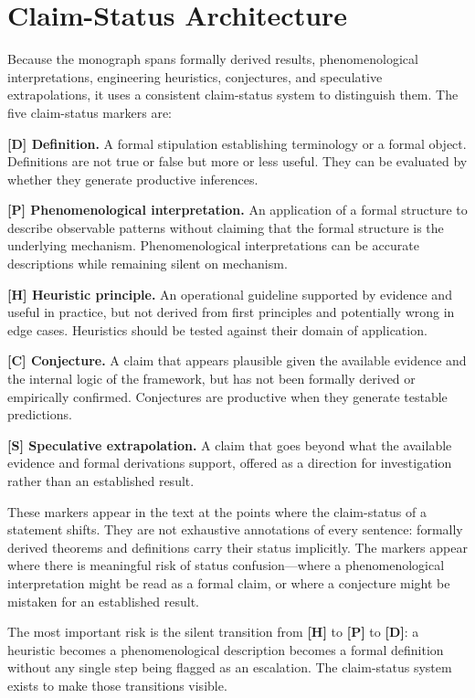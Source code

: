 \section*{Claim-Status Architecture}

Because the monograph spans formally derived results, phenomenological interpretations,
engineering heuristics, conjectures, and speculative extrapolations, it uses a
consistent claim-status system to distinguish them. The five claim-status markers are:

\begin{claimstatus}
\textbf{[D] Definition.} A formal stipulation establishing terminology or a formal
object. Definitions are not true or false but more or less useful. They can be
evaluated by whether they generate productive inferences.

\textbf{[P] Phenomenological interpretation.} An application of a formal structure
to describe observable patterns without claiming that the formal structure is the
underlying mechanism. Phenomenological interpretations can be accurate descriptions
while remaining silent on mechanism.

\textbf{[H] Heuristic principle.} An operational guideline supported by evidence and
useful in practice, but not derived from first principles and potentially wrong in
edge cases. Heuristics should be tested against their domain of application.

\textbf{[C] Conjecture.} A claim that appears plausible given the available evidence
and the internal logic of the framework, but has not been formally derived or
empirically confirmed. Conjectures are productive when they generate testable
predictions.

\textbf{[S] Speculative extrapolation.} A claim that goes beyond what the available
evidence and formal derivations support, offered as a direction for investigation
rather than an established result.
\end{claimstatus}

These markers appear in the text at the points where the claim-status of a statement
shifts. They are not exhaustive annotations of every sentence: formally derived
theorems and definitions carry their status implicitly. The markers appear where
there is meaningful risk of status confusion---where a phenomenological
interpretation might be read as a formal claim, or where a conjecture might be
mistaken for an established result.

The most important risk is the silent transition from \textbf{[H]} to \textbf{[P]}
to \textbf{[D]}: a heuristic becomes a phenomenological description becomes a
formal definition without any single step being flagged as an escalation. The
claim-status system exists to make those transitions visible.


